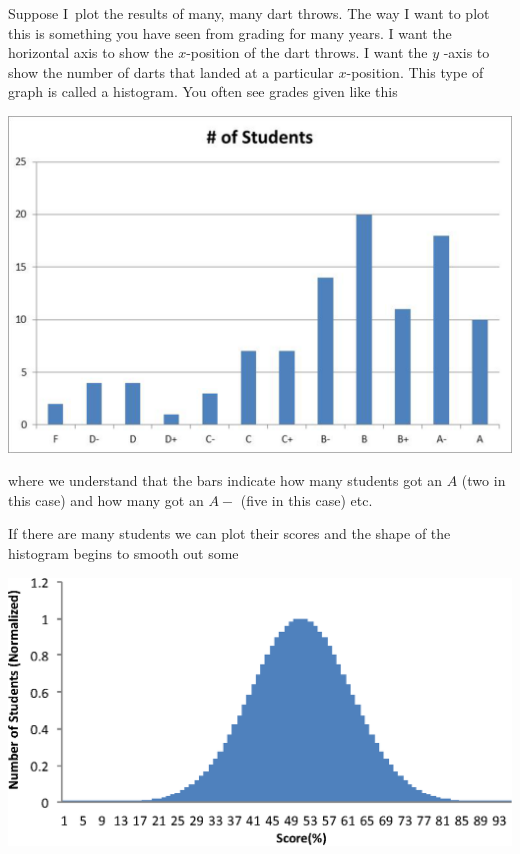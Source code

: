 \documentclass[twoside,11pt,ShortChapTitles]{BYUTextbook}
\begin{document}
Suppose I\ plot the results of many, many dart throws. The way I want to
plot this is something you have seen from grading for many years. I want the
horizontal axis to show the $x$-position of the dart throws. I want the $y$%
-axis to show the number of darts that landed at a particular $x$-position.
This type of graph is called a histogram. You often see grades given like
this

\begin{center}
\includegraphics[scale=0.5]{Lab2_figs/hist_few.eps}
\end{center}

where we understand that the bars
indicate how many students got an $A$ (two in this case) and how many got an
$A-$ (five in this case) etc.

If there are many students we can plot their scores and the shape of the
histogram begins to smooth out some

\begin{center}
\includegraphics[scale=0.5]{Lab2_figs/hist_many.eps}
\end{center}
\end{document}
